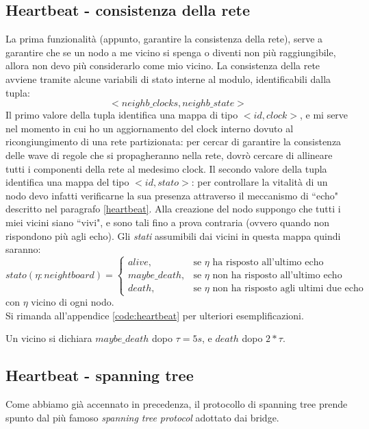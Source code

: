\documentclass[italian]{memoir}
\begin{document}
\subsection{Heartbeat - consistenza della rete}
La prima funzionalità (appunto, garantire la consistenza della rete), serve a garantire che se un nodo a me vicino si spenga o diventi non più raggiungibile, allora non devo più considerarlo come mio vicino. La consistenza della rete avviene tramite alcune variabili di stato interne al modulo, identificabili dalla tupla:
$$
    <neighb\_clocks, neighb\_state>
$$
Il primo valore della tupla identifica una mappa di tipo $<id,clock>$, e mi serve nel momento in cui ho un aggiornamento del clock interno dovuto al ricongiungimento di una rete partizionata: per cercar di garantire la consistenza delle wave di regole che si propagheranno nella rete, dovrò cercare di allineare tutti i componenti della rete al medesimo clock.
Il secondo valore della tupla identifica una mappa del tipo $<id,stato>$: per controllare la vitalità di un nodo devo infatti verificarne la sua presenza attraverso il meccanismo di ``echo" descritto nel paragrafo \ref{heartbeat}. Alla creazione del nodo suppongo che tutti i miei vicini siano ``vivi", e sono tali fino a prova contraria (ovvero quando non rispondono più agli echo). Gli \emph{stati} assumibili dai vicini in questa mappa quindi saranno:
$$
stato(\eta:neightboard)=\begin{cases}
                         alive, & \mbox{se }\eta\mbox{ ha risposto all'ultimo echo} \\
                         maybe\_death, & \mbox{se }\eta\mbox{ non ha risposto all'ultimo echo}\\
                         death, & \mbox{se }\eta\mbox{ non ha risposto agli ultimi due echo}
                   \end{cases}
$$
con $\eta$ vicino di ogni nodo.\\
Si rimanda all'appendice \ref{code:heartbeat} per ulteriori esemplificazioni.

Un vicino si dichiara $maybe\_death$ dopo $\tau = 5s$, e $death$ dopo $2*\tau$.

\subsection{Heartbeat - spanning tree}
Come abbiamo già accennato in precedenza, il protocollo di spanning tree prende spunto dal più famoso \textit{spanning tree protocol} adottato dai bridge. 
\end{document}
